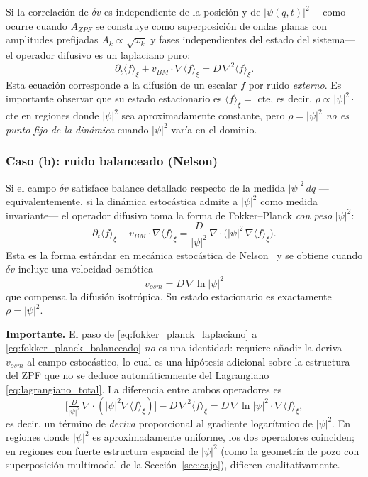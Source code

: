 \documentclass[11pt,a4paper]{article}
\begin{document}
Si la correlación de $\delta v$ es independiente de la posición y de
$|\psi(q,t)|^2$ ---como ocurre cuando $A_{ZPF}$ se construye como
superposición de ondas planas con amplitudes prefijadas
$A_k\propto\sqrt{\omega_k}$ y fases independientes del estado del
sistema--- el operador difusivo es un laplaciano puro:
\begin{equation}
\partial_t\langle f\rangle_\xi + v_{BM}\cdot\nabla\langle f\rangle_\xi
= D\,\nabla^2\langle f\rangle_\xi.
\label{eq:fokker_planck_laplaciano}
\end{equation}
Esta ecuación corresponde a la difusión de un escalar $f$ por ruido
\emph{externo}. Es importante observar que su estado estacionario es
$\langle f\rangle_\xi=$ cte, es decir, $\rho\propto|\psi|^2\cdot$cte
en regiones donde $|\psi|^2$ sea aproximadamente constante, pero
\emph{$\rho=|\psi|^2$ no es punto fijo de la dinámica} cuando $|\psi|^2$
varía en el dominio.

\subsubsection*{Caso (b): ruido balanceado (Nelson)}

Si el campo $\delta v$ satisface balance detallado respecto de la medida
$|\psi|^2\,dq$ ---equivalentemente, si la dinámica estocástica admite a
$|\psi|^2$ como medida invariante--- el operador difusivo toma la forma
de Fokker--Planck \emph{con peso} $|\psi|^2$:
\begin{equation}
\partial_t\langle f\rangle_\xi + v_{BM}\cdot\nabla\langle f\rangle_\xi
= \frac{D}{|\psi|^2}\,\nabla\cdot\!\Big(|\psi|^2\,\nabla\langle f\rangle_\xi\Big).
\label{eq:fokker_planck_balanceado}
\end{equation}
Esta es la forma estándar en mecánica estocástica de
Nelson~\cite{Nelson1966} y se obtiene cuando $\delta v$ incluye una
velocidad osmótica
\begin{equation}
v_{osm} = D\,\nabla\ln|\psi|^2
\label{eq:v_osmotic}
\end{equation}
que compensa la difusión isotrópica. Su estado estacionario es
exactamente $\rho=|\psi|^2$.

\textbf{Importante.} El paso de \eqref{eq:fokker_planck_laplaciano} a
\eqref{eq:fokker_planck_balanceado} \emph{no} es una identidad: requiere
añadir la deriva $v_{osm}$ al campo estocástico, lo cual es una hipótesis
adicional sobre la estructura del ZPF que no se deduce automáticamente
del Lagrangiano \eqref{eq:lagrangiano_total}. La diferencia entre ambos
operadores es
\begin{equation}
\Big[\tfrac{D}{|\psi|^2}\,\nabla\cdot(|\psi|^2\nabla\langle f\rangle_\xi)\Big]
- D\,\nabla^2\langle f\rangle_\xi
= D\,\nabla\ln|\psi|^2\cdot\nabla\langle f\rangle_\xi,
\label{eq:diferencia_operadores}
\end{equation}
es decir, un término de \emph{deriva} proporcional al gradiente
logarítmico de $|\psi|^2$. En regiones donde $|\psi|^2$ es
aproximadamente uniforme, los dos operadores coinciden; en regiones con
fuerte estructura espacial de $|\psi|^2$ (como la geometría de pozo con
superposición multimodal de la Sección~\ref{sec:caja}), difieren
cualitativamente.
\end{document}
